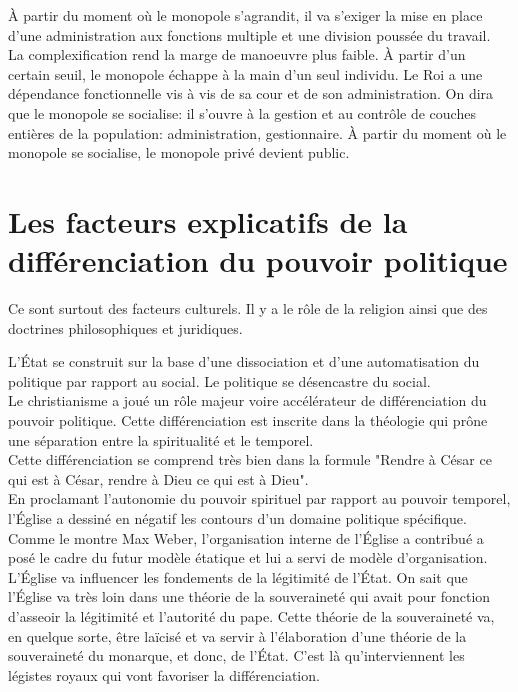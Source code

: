 \documentclass[10pt, a4paper, openany]{book}
\begin{document}
À partir du moment où le monopole s'agrandit, il va s'exiger la mise en place d'une administration aux fonctions multiple et une division poussée du travail. \\
La complexification rend la marge de manoeuvre plus faible. À partir d'un certain seuil, le monopole échappe à la main d'un seul individu. Le Roi a une dépendance fonctionnelle vis à vis de sa cour et de son administration. On dira que le monopole se socialise: il s'ouvre à la gestion et au contrôle de couches entières de la population: administration, gestionnaire. À partir du moment où le monopole se socialise, le monopole privé devient public. 

\section{Les facteurs explicatifs de la différenciation du pouvoir politique}

Ce sont surtout des facteurs culturels. Il y a le rôle de la religion ainsi que des doctrines philosophiques et juridiques.


L'État se construit sur la base d'une dissociation et d'une automatisation du politique par rapport au social. Le politique se désencastre du social. \\
Le christianisme a joué un rôle majeur voire accélérateur de différenciation du pouvoir politique. Cette différenciation est inscrite dans la théologie qui prône une séparation entre la spiritualité et le temporel. \\
Cette différenciation se comprend très bien dans la formule "Rendre à César ce qui est à César, rendre à Dieu ce qui est à Dieu". \\
En proclamant l'autonomie du pouvoir spirituel par rapport au pouvoir temporel, l'Église a dessiné en négatif les contours d'un domaine politique spécifique. \\
Comme le montre Max Weber, l'organisation interne de l'Église a contribué a posé le cadre du futur modèle étatique et lui a servi de modèle d'organisation. L'Église va influencer les fondements de la légitimité de l'État. On sait que l'Église va très loin dans une théorie de la souveraineté qui avait pour fonction d'asseoir la légitimité et l'autorité du pape. Cette théorie de la souveraineté va, en quelque sorte, être laïcisé et va servir à l'élaboration d'une théorie de la souveraineté du monarque, et donc, de l'État. C'est là qu'interviennent les légistes royaux qui vont favoriser la différenciation.  
\end{document}
